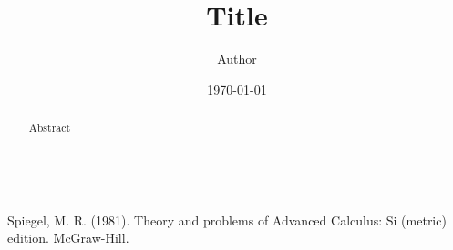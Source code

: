 \documentclass[10pt,leqno]{amsart}
\begin{document}
\title{Title} %
\author[Initial Surname]{Author}
\date{\today}
\address{Address}
\maketitle

\let\thefootnote\relax
{} %

\begin{abstract}
Abstract 
\end{abstract} %

\bigskip

\noindent \lipsum[1] \cite{1}

$\,$

$\,$

\begin{thebibliography}{99}

 Spiegel, M. R. (1981). Theory and problems of Advanced Calculus: Si (metric) edition. McGraw-Hill. 

\end{thebibliography}
\end{document}
